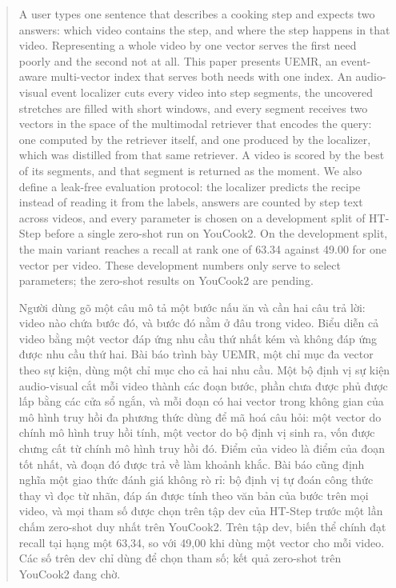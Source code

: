 \documentclass{IEEEtran}
\begin{document}
\begin{abstract}
A user types one sentence that describes a cooking step and expects two answers: which video contains the step, and where the step happens in that video. Representing a whole video by one vector serves the first need poorly and the second not at all. This paper presents UEMR, an event-aware multi-vector index that serves both needs with one index. An audio-visual event localizer cuts every video into step segments, the uncovered stretches are filled with short windows, and every segment receives two vectors in the space of the multimodal retriever that encodes the query: one computed by the retriever itself, and one produced by the localizer, which was distilled from that same retriever. A video is scored by the best of its segments, and that segment is returned as the moment. We also define a leak-free evaluation protocol: the localizer predicts the recipe instead of reading it from the labels, answers are counted by step text across videos, and every parameter is chosen on a development split of HT-Step before a single zero-shot run on YouCook2. On the development split, the main variant reaches a recall at rank one of 63.34 against 49.00 for one vector per video. These development numbers only serve to select parameters; the zero-shot results on YouCook2 are pending.

Người dùng gõ một câu mô tả một bước nấu ăn và cần hai câu trả lời: video nào chứa bước đó, và bước đó nằm ở đâu trong video. Biểu diễn cả video bằng một vector đáp ứng nhu cầu thứ nhất kém và không đáp ứng được nhu cầu thứ hai. Bài báo trình bày UEMR, một chỉ mục đa vector theo sự kiện, dùng một chỉ mục cho cả hai nhu cầu. Một bộ định vị sự kiện audio-visual cắt mỗi video thành các đoạn bước, phần chưa được phủ được lấp bằng các cửa sổ ngắn, và mỗi đoạn có hai vector trong không gian của mô hình truy hồi đa phương thức dùng để mã hoá câu hỏi: một vector do chính mô hình truy hồi tính, một vector do bộ định vị sinh ra, vốn được chưng cất từ chính mô hình truy hồi đó. Điểm của video là điểm của đoạn tốt nhất, và đoạn đó được trả về làm khoảnh khắc. Bài báo cũng định nghĩa một giao thức đánh giá không rò rỉ: bộ định vị tự đoán công thức thay vì đọc từ nhãn, đáp án được tính theo văn bản của bước trên mọi video, và mọi tham số được chọn trên tập dev của HT-Step trước một lần chấm zero-shot duy nhất trên YouCook2. Trên tập dev, biến thể chính đạt recall tại hạng một 63,34, so với 49,00 khi dùng một vector cho mỗi video. Các số trên dev chỉ dùng để chọn tham số; kết quả zero-shot trên YouCook2 đang chờ.
\end{abstract}
\end{document}
